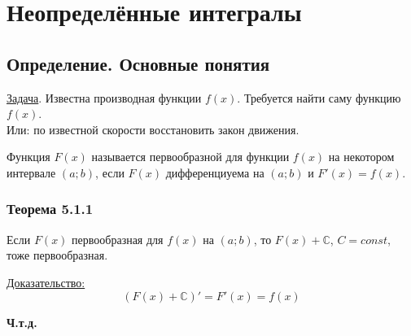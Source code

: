 \documentclass[12pt]{article}
\begin{document}
    \section{Неопределённые интегралы}
    \subsection{Определение. Основные понятия}
    \underline{Задача}. Известна производная функции $f(x)$. Требуется найти саму функцию $f(x)$.\\
    Или: по известной скорости восстановить закон движения.\par\noindent
    Функция $F(x)$ называется первообразной для функции $f(x)$ на некотором интервале $(a; b)$, если $F(x)$ дифференциуема на $(a; b)$ и $F'(x) = f(x)$.
    \subsubsection*{Теорема 5.1.1}\label{th:5.1.1}
    Если $F(x)$ первообразная для $f(x)$ на $(a; b)$, то $F(x) + \mathbb{C}$, $C = const$, тоже первообразная.\par\noindent
    \underline{Доказательство:}
    \[ (F(x) + \mathbb{C})' = F'(x) = f(x) \]
    \begin{center}
        \textbf{Ч.т.д.}
    \end{center}
\end{document}
